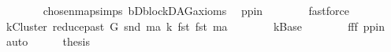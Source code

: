 \begin{isabellebody}
\ \ \ \ \ \ \isamarkupfalse%
\ chosen{\isacharunderscore}{\kern0pt}map{\isacharunderscore}{\kern0pt}simps{\isacharparenleft}{\kern0pt}{}{\isacharparenright}{\kern0pt}\ bD{\isachardot}{\kern0pt}blockDAG{\isacharunderscore}{\kern0pt}axioms\ \isamarkupfalse%
\ pp{\isacharunderscore}{\kern0pt}in\isanewline
\ \ \ \ \ \ \isamarkupfalse%
\ fastforce\ \ \isanewline
\ \ \ \ \isamarkupfalse%
\ \isamarkupfalse%
\ {\isachardoublequoteopen}kCluster\ {\isacharparenleft}{\kern0pt}reduce{\isacharunderscore}{\kern0pt}past\ G\ {\isacharparenleft}{\kern0pt}snd\ ma{\isacharparenright}{\kern0pt}{\isacharparenright}{\kern0pt}\ k\ {\isacharparenleft}{\kern0pt}fst\ {\isacharparenleft}{\kern0pt}fst\ ma{\isacharparenright}{\kern0pt}{\isacharparenright}{\kern0pt}{\isachardoublequoteclose}\isanewline
\ \ \ \ \ \ \isamarkupfalse%
\ kBase\isanewline
\ \ \ \ \ \ \isamarkupfalse%
\ fff\ pp{\isacharunderscore}{\kern0pt}in\ \isamarkupfalse%
\ auto\isanewline
\ \ \ \ \isamarkupfalse%
\ {\isacharquery}{\kern0pt}thesis\ \isamarkupfalse%
\isanewline
\ \ \isamarkupfalse%
\ \isanewline
{}\isamarkupfalse%
%
\endisatagproof
{\isafoldproof}%
%
\isadelimproof
\ \isanewline
%
\endisadelimproof
\isanewline
\isanewline
%
\isadelimtheory
\isanewline
%
\endisadelimtheory
%
\isatagtheory
{}\isamarkupfalse%
%
\endisatagtheory
{\isafoldtheory}%
%
\isadelimtheory
%
\endisadelimtheory
%
\end{isabellebody}%
\endinput
